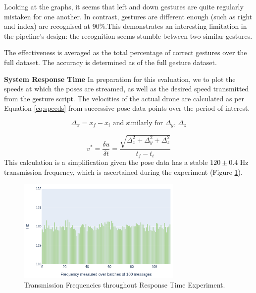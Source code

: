  Looking at the graphs, it seems that left and down gestures are quite regularly mistaken for one another. In contrast, gestures are different enough (such as right and index) are recognised at 90\%.This demonstrates an interesting limitation in the pipeline's design: the recognition seems stumble between two similar gestures. 

The effectiveness is averaged as the total percentage of correct gestures over the full dataset. The accuracy is determined as  of the full gesture dataset. 




\textbf{System Response Time} \hspace{0.3cm} In preparation for this evaluation, we to plot the speeds at which the poses are streamed, as well as the desired speed transmitted from the gesture script. The  velocities of the actual drone are calculated as per Equation \ref{eq:speeds} from successive pose data points over the period of interest. 

\begin{equation}
    \Delta_x = {x_f - x_i} \text{ and similarly for } \Delta_{y}\text{, } \Delta_{z}
\end{equation}

\begin{equation}
    v^* = \frac{\delta u}{\delta t} = \frac{\sqrt{\Delta_{x}^2 + \Delta_{y}^2 + \Delta_{z}^2}}{t_f - t_i}
    \label{eq:speeds}
\end{equation}
This calculation is a simplification given the pose data has a stable $120 \pm 0.4$ Hz transmission frequency, which is ascertained during the experiment (Figure \ref{fig:frequency_check}). 

\begin{figure}[!h]
    \raggedright
    \includegraphics[width=8cm]{images/xr_graphs/freq_hdiC.png}
    
    \caption{Transmission Frequencies throughout Response Time Experiment.}
    \label{fig:frequency_check}
\end{figure}

